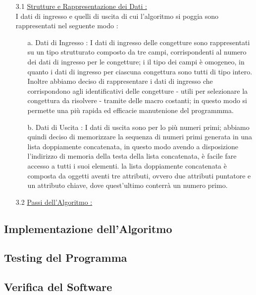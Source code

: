 \documentclass{article}
\begin{document}
    \begin{enumerate}
    \Large \item[3.1] \underline{Strutture e Rappresentazione dei Dati : } 
    \large \\I dati di ingresso e quelli di uscita di cui l'algoritmo si poggia sono rappresentati nel seguente modo : 
    \begin{enumerate}
        \item[a.] Dati di Ingresso : I dati di ingresso delle congetture sono rappresentati su un tipo strutturato composto da tre campi, corrispondenti al numero dei dati di ingresso per le congetture; i il tipo dei campi è omogeneo, in quanto i dati di ingresso per ciascuna congettura sono tutti di tipo intero. Inoltre abbiamo deciso di rappresentare i dati di ingresso che corrispondono agli identificativi delle congetture - utili per selezionare la congettura da risolvere - tramite delle macro costanti; in questo modo si permette una più rapida ed efficacie manutenione del programmma.
        \item[b.] Dati di Uscita : I dati di uscita sono per lo più numeri primi; abbiamo quindi deciso di memorizzare la sequenza di numeri primi generata in una lista doppiamente concatenata, in questo modo avendo a disposizione l'indirizzo di memoria della testa della lista concatenata, è facile fare accesso a tutti i suoi elementi. la lista doppiamente concatenata è composta da oggetti aventi tre attributi, ovvero due attributi puntatore e un attributo chiave, dove quest'ultimo conterrà un numero primo. 
    \end{enumerate}
    \Large \item[3.2] \underline{Passi dell'Algoritmo : }
\end{enumerate}

\newpage
\begin{center}
    \section{Implementazione dell'Algoritmo}
\end{center}

\newpage
\begin{center}
    \section{Testing del Programma}
\end{center}

\newpage
\begin{center}
    \section{Verifica del Software}
\end{center}
\end{document}
